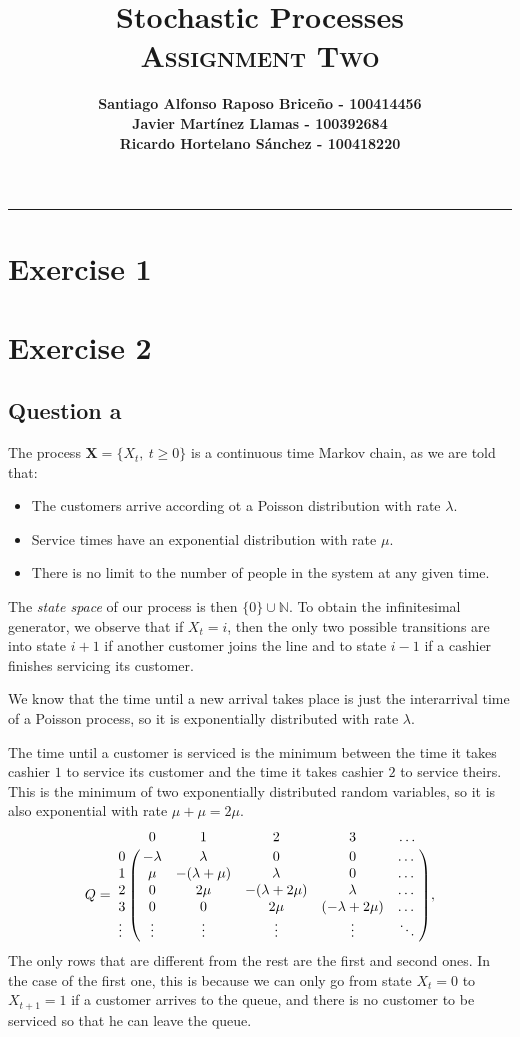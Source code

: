 \documentclass[11pt, a4paper]{article}
\title{\vspace{-8ex} \huge \bfseries Stochastic Processes\\
	\LARGE \normalfont \textsc{Assignment Two} \vspace{-2ex}}
\author{\bfseries Santiago Alfonso Raposo Briceño - 100414456 \\
	\bfseries Javier Martínez Llamas - 100392684\\
	\bfseries Ricardo Hortelano Sánchez - 100418220}
\date{\vspace{-5ex}} %
\begin{document}
	\maketitle
	\hrule

\section{Exercise 1}

\section{Exercise 2}
\subsection*{Question a}
The process $\bm{X} = \{X_t, \ t\geq 0\}$ is a continuous time Markov chain, as we are told that:
\begin{itemize}
	\item The customers arrive according ot a Poisson distribution with rate $\lambda$.
	\item Service times have an exponential distribution with rate $\mu$.
	\item There is no limit to the number of people in the system at any given time.
\end{itemize}

The \emph{state space} of our process is then $\{0\} \cup \mathbb{N}$. 
To obtain the infinitesimal generator, we observe that if $X_t = i$, then the only two possible transitions are into state $i+1$ if another customer joins the line and to state $i-1$ if a cashier finishes servicing its customer.

We know that the time until a new arrival takes place is just the interarrival time of a Poisson process, so it is exponentially distributed with rate $\lambda$.

The time until a customer is serviced is the minimum between the time it takes cashier $1$ to service its customer and the time it takes cashier $2$ to service theirs. 
This is the minimum of two exponentially distributed random variables, so it is also exponential with rate $\mu + \mu = 2\mu$.
\[
Q = \bordermatrix{%
	 & 0 & 1 & 2 & 3 & \dots \cr
	0& -\lambda & \lambda  & 0        & 0        & \dots  \cr
	1 & \mu       & -(\lambda+\mu) & \lambda  & 0        & \dots  \cr
	2& 0        & 2\mu        & -(\lambda+2\mu) & \lambda  & \dots  \cr
	3 &0        & 0        & 2\mu        & (-\lambda + 2\mu) & \dots  \cr
	\vdots & \vdots   & \vdots   & \vdots   & \vdots   & \ddots
},
\]
The only rows that are different from the rest are the first and second ones.
In the case of the first one, this is because we can only go from state $X_t = 0$ to $X_{t+1} = 1$ if a customer arrives to the queue, and there is no customer to be serviced so that he can leave the queue.
\end{document}

